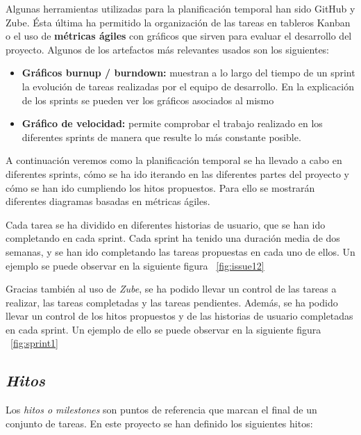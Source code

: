  Algunas herramientas utilizadas para la planificación temporal han sido GitHub y Zube. Ésta última ha permitido la organización de las tareas en tableros Kanban o el uso de \textbf{métricas ágiles} con gráficos que sirven para evaluar el desarrollo del proyecto. Algunos de los artefactos más relevantes usados son los siguientes:
 \begin{itemize}
 	\item{\textbf{Gráficos burnup / burndown:}} muestran a lo largo del tiempo de un sprint la evolución de tareas realizadas por el equipo de desarrollo. En la explicación de los sprints se pueden ver los gráficos asociados al mismo
 \item{\textbf{Gráfico de velocidad: }} permite comprobar el trabajo realizado en los diferentes sprints de manera que resulte lo más constante posible.
\end{itemize}
 A continuación veremos como la planificación temporal se ha llevado a cabo en diferentes sprints, cómo se ha ido iterando en las diferentes partes del proyecto y cómo se han ido cumpliendo los hitos propuestos. Para ello se mostrarán diferentes diagramas basadas en métricas ágiles.

 Cada tarea se ha dividido en diferentes historias de usuario, que se han ido completando en cada sprint. Cada sprint ha tenido una duración media de dos semanas, y se han ido completando las tareas propuestas en cada uno de ellos.
 Un ejemplo se puede observar en la siguiente figura ~\ref{fig:issue12}

Gracias también al uso de \textit{Zube}, se ha podido llevar un control de las tareas a realizar, las tareas completadas y las tareas pendientes. Además, se ha podido llevar un control de los hitos propuestos y de las historias de usuario completadas en cada sprint. Un ejemplo de ello se puede observar en la siguiente figura ~\ref{fig:sprint1}

\subsection{\textit{Hitos}}
Los \textit{hitos o milestones} son puntos de referencia que marcan el final de un conjunto de tareas. En este proyecto se han definido los siguientes hitos:

